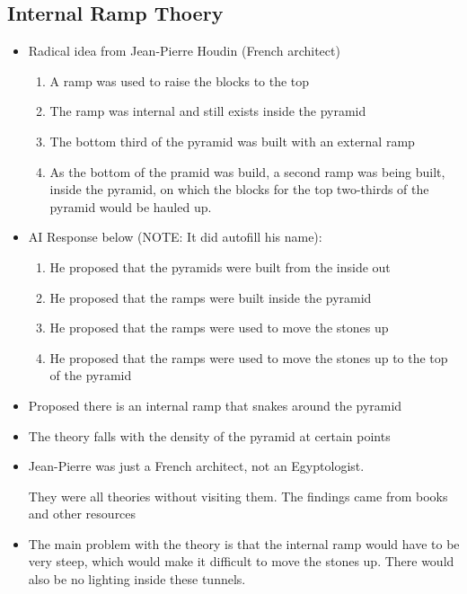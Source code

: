 \documentclass{article}
\begin{document}
\subsection{Internal Ramp Thoery}
\begin{itemize}
  \item Radical idea from Jean-Pierre Houdin (French architect)
    \begin{enumerate}
      \item A ramp was used to raise the blocks to the top
      \item The ramp was internal and still exists inside the pyramid
      \item The bottom third of the pyramid was built with an external ramp
      \item As the bottom of the pramid was build, a second ramp
        was being built, inside the pyramid, on which the blocks for the top two-thirds
        of the pyramid would be hauled up.
    \end{enumerate}
  \item AI Response below (NOTE: It did autofill his name):
    \begin{enumerate}
      \item He proposed that the pyramids were built from the inside out
      \item He proposed that the ramps were built inside the pyramid
      \item He proposed that the ramps were used to move the stones up
      \item He proposed that the ramps were used to move the stones up to the top of the pyramid
    \end{enumerate}
  \item Proposed there is an internal ramp that snakes around the pyramid
  \item The theory falls with the density of the pyramid at certain points
  \item Jean-Pierre was just a French architect, not an Egyptologist.

    They were all theories without visiting them. The findings came from
    books and other resources
  \item The main problem with the theory is that the internal ramp would have to be
    very steep, which would make it difficult to move the stones up. There
    would also be no lighting inside these tunnels.
\end{itemize}
\end{document}
